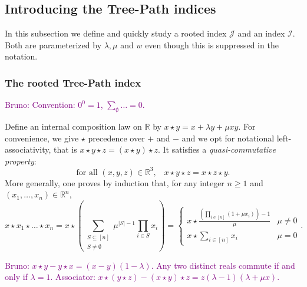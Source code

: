 \documentclass[11 pt]{modarticle}
\newcommand{\cR}{\mathbb{R}}
\newcommand{\wmap}{w}
\newcommand{\indexsymbol}{\mathcal{I}}
\newcommand{\rindexsymbol}{\mathcal{J}}
\newcommand{\bldcomment}[1]{\textcolor{purple}{{\footnotesize Bruno:} #1}}
\begin{document}
\subsection{Introducing the Tree-Path indices}

In this subsection we define and quickly study a rooted index $\rindexsymbol$ and an index $\indexsymbol$. Both are parameterized by $\lambda, \mu$ and $\wmap$ even though this is suppressed in the notation.%

\subsubsection{The rooted Tree-Path index}
\bldcomment{Convention: $0^0=1$, $\sum_\emptyset \dots = 0$.}

Define an internal composition law on $\cR$ by $x \star y =  x + \lambda y + \mu x y$. For convenience, we give $\star$ precedence over $+$ and $-$ and we opt for notational left-associativity, that is $x\star y \star z = (x \star y) \star z$.  It satisfies a \emph{quasi-commutative property}: 
\begin{equation}
   \text{for all $(x,y,z)\in\cR^3$,}\quad x \star y \star z = x \star z \star y.\label{eq:commutativity}
\end{equation}  
More generally, one proves by induction that, for any integer $n \geq 1$ and $(x_1,\dots,x_n)\in \cR^n$,
\[ x \star x_1 \star \dots \star x_n = x \star \left(\sum_{\substack{S \subseteq [n]\\S\neq \emptyset}} \mu^{|S|-1} \prod_{i\in S} x_i \right)
= \begin{cases} x \star \frac{ \left( \prod_{i\in [n]} (1 + \mu x_i) \right)- 1}{\mu}  & \mu \neq 0\\
x \star  \sum_{i\in [n]} x_i  & \mu = 0 \end{cases}.
\]




\bldcomment{$x \star y - y \star x = (x - y)(1 - \lambda)$.  Any two distinct reals commute if and only if $\lambda=1$. Associator: $x \star(y\star z) - (x\star y) \star z = z (\lambda - 1)(\lambda + \mu x)$.}
\end{document}
